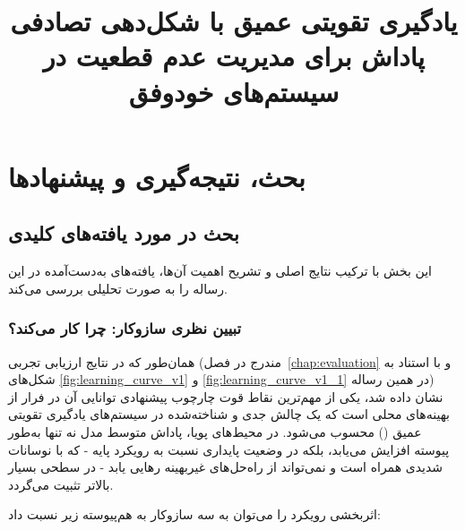\documentclass[oneside,openany,phd]{TMU-Thesis}
\title{یادگیری تقویتی عمیق با شکل‌دهی تصادفی پاداش برای مدیریت عدم قطعیت در سیستم‌های خودوفق}
\begin{document}
\AutoPersianDigits
{}

\setcounter{chapter}{5}

\chapter{بحث، نتیجه‌گیری و پیشنهادها}
\label{chap:discussion}

\section{بحث در مورد یافته‌های کلیدی}

این بخش با ترکیب نتایج اصلی و تشریح اهمیت آن‌ها، یافته‌های به‌دست‌آمده در این رساله را به صورت تحلیلی بررسی می‌کند.

\subsection{تبیین نظری سازوکار: چرا  کار می‌کند؟}

همان‌طور که در نتایج ارزیابی تجربی (مندرج در فصل~\ref{chap:evaluation} و با استناد به شکل‌های \ref{fig:learning_curve_v1} و \ref{fig:learning_curve_v1_1} در همین رساله) نشان داده شد، یکی از مهم‌ترین نقاط قوت چارچوب پیشنهادی  توانایی آن در فرار از بهینه‌های محلی است که یک چالش جدی و شناخته‌شده در سیستم‌های یادگیری تقویتی عمیق () محسوب می‌شود. در محیط‌های پویا، پاداش متوسط مدل  نه تنها به‌طور پیوسته افزایش می‌یابد، بلکه در وضعیت پایداری نسبت به رویکرد پایه  - که با نوسانات شدیدی همراه است و نمی‌تواند از راه‌حل‌های غیربهینه رهایی یابد - در سطحی بسیار بالاتر تثبیت می‌گردد.

اثربخشی رویکرد  را می‌توان به سه سازوکار به هم‌پیوسته زیر نسبت داد:
\end{document}
